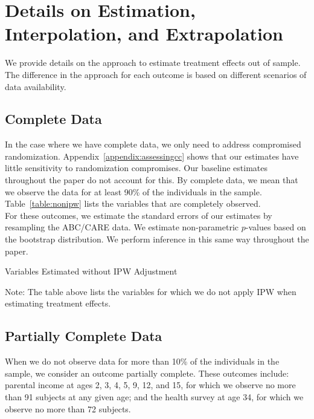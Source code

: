 \section{Details on Estimation, Interpolation, and Extrapolation} \label{appendix:methodology}

\noindent We provide details on the approach to estimate treatment effects out of sample. The difference in the approach for each outcome is based on different scenarios of data availability.

\subsection{Complete Data}
\label{app:method_fullobs}

\noindent  In the case where we have complete data, we only need to address compromised randomization. Appendix~\ref{appendix:assessingcc} shows that our estimates have little sensitivity to randomization compromises. Our baseline estimates throughout the paper do not account for this. By complete data, we mean that we observe the data for at least 90\% of the individuals in the sample. Table~\ref{table:nonipw} lists the variables that are completely observed.\\

\noindent For these outcomes, we estimate the standard errors of our estimates by resampling the ABC/CARE data. We estimate non-parametric $p$-values based on the bootstrap distribution. We perform inference in this same way throughout the paper.

\begin{table}[H]
\begin{threeparttable}
\caption{Variables Estimated without IPW Adjustment}
\label{table:nonipw}
\centering

\begin{tablenotes}
\footnotesize
\item Note: The table above lists the variables for which we do not apply IPW when estimating
treatment effects.
\end{tablenotes}
\end{threeparttable}
\end{table}

\subsection{Partially Complete Data}
\label{app:method_partialobs}

\noindent When we do not observe data for more than 10\% of the individuals in the sample, we consider an outcome partially complete. These outcomes include: parental income at ages 2, 3, 4, 5, 9, 12, and 15, for which we observe no more than 91 subjects at any given age; and the health survey at age 34, for which we observe no more than 72 subjects.\\

